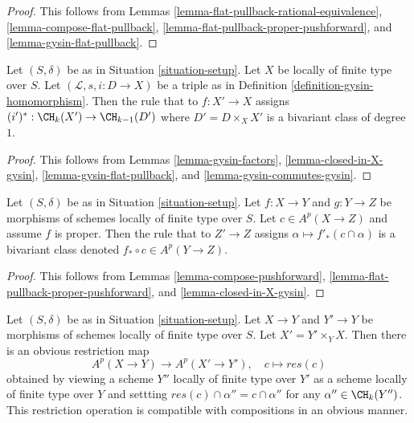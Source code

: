 \begin{proof}
This follows from
Lemmas \ref{lemma-flat-pullback-rational-equivalence},
\ref{lemma-compose-flat-pullback},
\ref{lemma-flat-pullback-proper-pushforward}, and
\ref{lemma-gysin-flat-pullback}.
\end{proof}

\begin{lemma}
\label{lemma-gysin-bivariant}
Let $(S, \delta)$ be as in Situation \ref{situation-setup}.
Let $X$ be locally of finite type over $S$.
Let $(\mathcal{L}, s, i : D \to X)$ be a triple as in
Definition \ref{definition-gysin-homomorphism}.
Then the rule that to $f : X' \to X$ assigns
$(i')^* : \CH_k(X') \to \CH_{k - 1}(D')$ where $D' = D \times_X X'$
is a bivariant class of degree $1$.
\end{lemma}

\begin{proof}
This follows from Lemmas \ref{lemma-gysin-factors},
\ref{lemma-closed-in-X-gysin},
\ref{lemma-gysin-flat-pullback}, and
\ref{lemma-gysin-commutes-gysin}.
\end{proof}

\begin{lemma}
\label{lemma-push-proper-bivariant}
Let $(S, \delta)$ be as in Situation \ref{situation-setup}.
Let $f : X \to Y$ and $g : Y \to Z$ be morphisms of
schemes locally of finite type over $S$.
Let $c \in A^p(X \to Z)$ and assume $f$ is proper.
Then the rule that to $Z' \to Z$ assigns
$\alpha \longmapsto f'_*(c \cap \alpha)$
is a bivariant class denoted $f_* \circ c \in A^p(Y \to Z)$.
\end{lemma}

\begin{proof}
This follows from Lemmas \ref{lemma-compose-pushforward},
\ref{lemma-flat-pullback-proper-pushforward}, and
\ref{lemma-closed-in-X-gysin}.
\end{proof}

\begin{remark}
\label{remark-restriction-bivariant}
Let $(S, \delta)$ be as in Situation \ref{situation-setup}. Let $X \to Y$
and $Y' \to Y$ be morphisms of schemes locally of finite type over $S$.
Let $X' = Y' \times_Y X$. Then there is an obvious restriction map
$$
A^p(X \to Y) \longrightarrow A^p(X' \to Y'),\quad
c \longmapsto res(c)
$$
obtained by viewing a scheme $Y''$ locally of finite type over $Y'$
as a scheme locally of finite type over $Y$ and settting
$res(c) \cap \alpha'' = c \cap \alpha''$ for any $\alpha'' \in \CH_k(Y'')$.
This restriction operation is compatible with compositions in an
obvious manner.
\end{remark}

